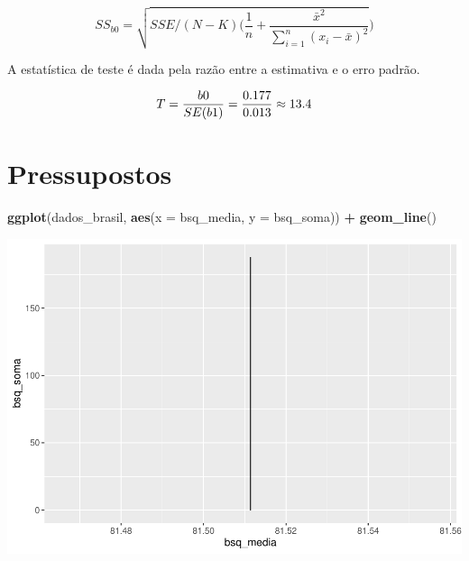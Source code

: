 \documentclass[
]{book}
\newenvironment{Shaded}{\begin{snugshade}}{\end{snugshade}}
\newcommand{\DataTypeTok}[1]{\textcolor[rgb]{0.13,0.29,0.53}{#1}}
\newcommand{\KeywordTok}[1]{\textcolor[rgb]{0.13,0.29,0.53}{\textbf{#1}}}
\newcommand{\NormalTok}[1]{#1}
\newcommand{\OperatorTok}[1]{\textcolor[rgb]{0.81,0.36,0.00}{\textbf{#1}}}
\newcommand{\StringTok}[1]{\textcolor[rgb]{0.31,0.60,0.02}{#1}}
\begin{document}
\[SS_{b0} = \sqrt{SSE/(N-K)(\frac{1}{n}+\frac{\bar{x}^2}{\sum_{i=1}^{n}(x_i - \bar{x})^2}})\]

A estatística de teste é dada pela razão entre a estimativa e o erro padrão.

\[ T = \frac{b0}{SE(b1)} \\ = \frac{0.177}{0.013} \\ \approx 13.4  \]

\hypertarget{pressupostos}{%
\section{Pressupostos}\label{pressupostos}}

\begin{Shaded}
\begin{Highlighting}[]
\KeywordTok{ggplot}\NormalTok{(dados_brasil, }\KeywordTok{aes}\NormalTok{(}\DataTypeTok{x =}\NormalTok{ bsq_media, }\DataTypeTok{y  =}\NormalTok{ bsq_soma)) }\OperatorTok{+}
\StringTok{  }\KeywordTok{geom_line}\NormalTok{()}
\end{Highlighting}
\end{Shaded}

\begin{center}\includegraphics{gitbook-demo_files/figure-latex/unnamed-chunk-100-1} \end{center}

\begin{Shaded}
\end{Shaded}
\end{document}

